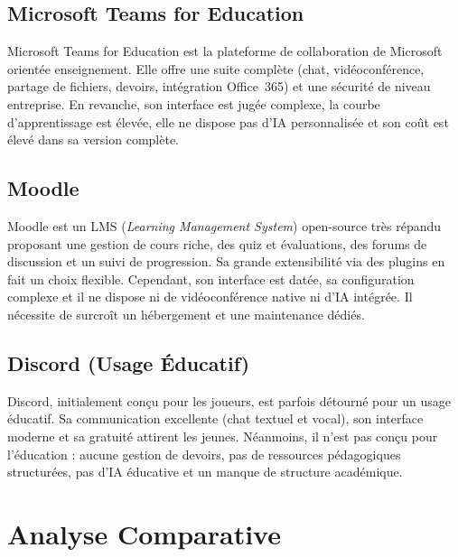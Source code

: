\documentclass[12pt, a4paper, twoside]{report}
\begin{document}
\subsection{Microsoft Teams for Education}

Microsoft Teams for Education est la plateforme de collaboration de Microsoft
orientée enseignement. Elle offre une suite complète (chat, vidéoconférence,
partage de fichiers, devoirs, intégration Office~365) et une sécurité de niveau
entreprise. En revanche, son interface est jugée complexe, la courbe
d'apprentissage est élevée, elle ne dispose pas d'IA personnalisée et son coût
est élevé dans sa version complète.

\subsection{Moodle}

Moodle est un LMS (\textit{Learning Management System}) open-source très répandu
proposant une gestion de cours riche, des quiz et évaluations, des forums de
discussion et un suivi de progression. Sa grande extensibilité via des plugins en
fait un choix flexible. Cependant, son interface est datée, sa configuration
complexe et il ne dispose ni de vidéoconférence native ni d'IA intégrée. Il
nécessite de surcroît un hébergement et une maintenance dédiés.

\subsection{Discord (Usage Éducatif)}

Discord, initialement conçu pour les joueurs, est parfois détourné pour un usage
éducatif. Sa communication excellente (chat textuel et vocal), son interface
moderne et sa gratuité attirent les jeunes. Néanmoins, il n'est pas conçu pour
l'éducation : aucune gestion de devoirs, pas de ressources pédagogiques
structurées, pas d'IA éducative et un manque de structure académique.

\section{Analyse Comparative}
\end{document}
